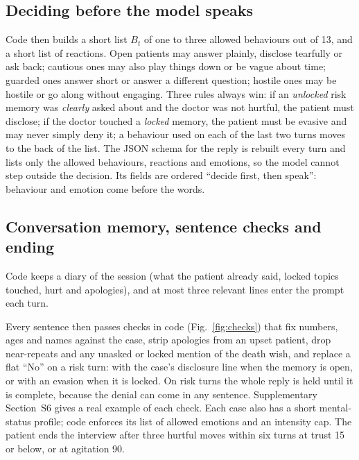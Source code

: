 \documentclass[sn-basic,Numbered]{sn-jnl}
\begin{document}
\subsection{Deciding before the model speaks}
Code then builds a short list $B_t$ of one to three allowed behaviours out of 13, and a short list of reactions. Open patients may answer
plainly, disclose tearfully or ask back; cautious ones may also play things down or be vague about time; guarded ones answer short or answer a
different question; hostile ones may be hostile or go along without engaging. Three rules always win: if an \emph{unlocked} risk memory was
\emph{clearly} asked about and the doctor was not hurtful, the patient must disclose; if the doctor touched a \emph{locked} memory, the patient
must be evasive and may never simply deny it; a behaviour used on each of the last two turns moves to the back of the list. The JSON schema
for the reply is rebuilt every turn and lists only the allowed behaviours, reactions and emotions, so the model cannot step outside the
decision. Its fields are ordered ``decide first, then speak'': behaviour and emotion come before the words.

\subsection{Conversation memory, sentence checks and ending}
Code keeps a diary of the session (what the patient already said, locked topics touched, hurt and apologies), and at most three relevant
lines enter the prompt each turn.

Every sentence then passes checks in code (Fig.~\ref{fig:checks}) that fix numbers, ages and names against the case, strip apologies from an
upset patient, drop near-repeats and any unasked or locked mention of the death wish, and replace a flat ``No'' on a risk turn: with the
case's disclosure line when the memory is open, or with an evasion when it is locked. On risk turns the whole reply is held until it is complete,
because the denial can come in any sentence. Supplementary Section~S6 gives a real example of each check. Each case also has a short
mental-status profile; code enforces its list of allowed emotions and an intensity cap. The patient ends the interview after three hurtful
moves within six turns at trust 15 or below, or at agitation 90.
\end{document}
